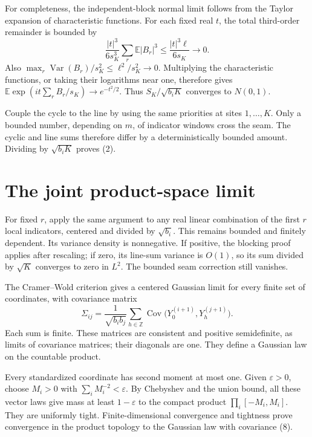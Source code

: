 \documentclass[11pt]{article}
\newcommand{\E}{\mathbb E}
\newcommand{\Var}{\operatorname{Var}}
\newcommand{\Cov}{\operatorname{Cov}}
\begin{document}
For completeness, the independent-block normal limit follows from
the Taylor expansion of characteristic functions. For each fixed real
\(t\), the total third-order remainder is bounded by
\[
 \frac{|t|^3}{6s_K^3}\sum_r\E|B_r|^3
 \leq\frac{|t|^3\ell}{6s_K}\longrightarrow0.
\]
Also \(\max_r\Var(B_r)/s_K^2\leq\ell^2/s_K^2\to0\).
Multiplying the characteristic functions, or taking their logarithms
near one, therefore gives
\(\E\exp(it\sum_r B_r/s_K)\to e^{-t^2/2}\).
Thus \(S_K/\sqrt{b_iK}\) converges to \(N(0,1)\).

Couple the cycle to the line by using the same priorities at sites
\(1,\ldots,K\). Only a bounded number, depending on \(m\), of indicator
windows cross the seam. The cyclic and line sums therefore differ by
a deterministically bounded amount. Dividing by \(\sqrt{b_iK}\)
proves (2).

\section*{The joint product-space limit}
For fixed \(r\), apply the same argument to any real linear combination
of the first \(r\) local indicators, centered and divided by
\(\sqrt{b_i}\). This remains bounded and finitely dependent.
Its variance density is nonnegative. If positive, the blocking proof
applies after rescaling; if zero, its line-sum variance is \(O(1)\),
so its sum divided by \(\sqrt K\) converges to zero in \(L^2\).
The bounded seam correction still vanishes.

The Cramer--Wold criterion gives a centered Gaussian limit for every
finite set of coordinates, with covariance matrix
\[
 \Sigma_{ij}=\frac{1}{\sqrt{b_i b_j}}
       \sum_{h\in\mathbb Z}
       \Cov\bigl(Y_0^{(i+1)},Y_h^{(j+1)}\bigr).              \tag{8}
\]
Each sum is finite. These matrices are consistent and positive
semidefinite, as limits of covariance matrices; their diagonals are one.
They define a Gaussian law on the countable product.

Every standardized coordinate has second moment at most one.
Given \(\varepsilon>0\), choose \(M_i>0\) with
\(\sum_i M_i^{-2}<\varepsilon\). By Chebyshev and the union bound,
all these vector laws give mass at least \(1-\varepsilon\) to the
compact product \(\prod_i[-M_i,M_i]\). They are uniformly tight.
Finite-dimensional convergence and tightness prove convergence in
the product topology to the Gaussian law with covariance (8).
\end{document}
